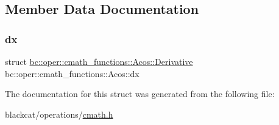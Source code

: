 \subsection{Member Data Documentation}
\mbox{\label{structbc_1_1oper_1_1cmath__functions_1_1Acos_a01f276736a773a9f88e39855163c5998}} 
\subsubsection{\texorpdfstring{dx}{dx}}
{\footnotesize\ttfamily struct \hyperlink{structbc_1_1oper_1_1cmath__functions_1_1Acos_1_1Derivative}{bc\+::oper\+::cmath\+\_\+functions\+::\+Acos\+::\+Derivative}   bc\+::oper\+::cmath\+\_\+functions\+::\+Acos\+::dx}



The documentation for this struct was generated from the following file\+:\begin{DoxyCompactItemize}
\item 
blackcat/operations/\hyperlink{cmath_8h}{cmath.\+h}\end{DoxyCompactItemize}
